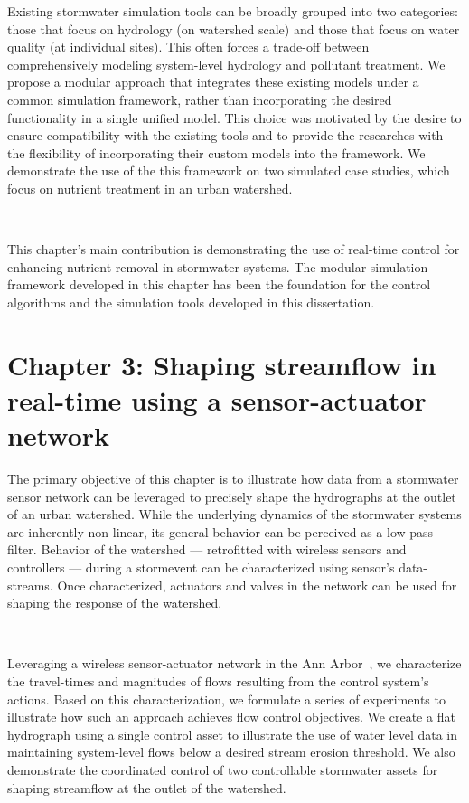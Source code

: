 Existing stormwater simulation tools can be broadly grouped into two categories: those that focus on hydrology (on watershed scale)\cite{Rossman2010Storm5.1} and those that focus on water quality (at individual sites)\cite{Langergraber2009CWM1:Wetlands}.
This often forces a trade-off between comprehensively modeling system-level hydrology and pollutant treatment.
We propose a modular approach that integrates these existing models under a common simulation framework, rather than incorporating the desired functionality in a single unified model.
This choice was motivated by the desire to ensure compatibility with the existing tools and to provide the researches with the flexibility of incorporating their custom models into the framework.
We demonstrate the use of the this framework on two simulated case studies, which focus on nutrient treatment in an urban watershed.

\

This chapter's main contribution is demonstrating the use of real-time control for enhancing nutrient removal in stormwater systems.
The modular simulation framework developed in this chapter has been the foundation for the control algorithms and the simulation tools developed in this dissertation. 

\section{Chapter 3: Shaping streamflow in real-time using a sensor-actuator network}

The primary objective of this chapter is to illustrate how data from a stormwater sensor network can be leveraged to precisely shape the hydrographs at the outlet of an urban watershed.
While the underlying dynamics of the stormwater systems are inherently non-linear, its general behavior can be perceived as a low-pass filter.
Behavior of the watershed --- retrofitted with wireless sensors and controllers --- during a stormevent can be characterized using sensor's data-streams.
Once characterized, actuators and valves in the network can be used for shaping the response of the watershed.

\

Leveraging a wireless sensor-actuator network in the Ann Arbor~\cite{Bartos_2018}, we characterize the travel-times and magnitudes of flows resulting from the control system's actions.
Based on this characterization, we formulate a series of experiments to illustrate how such an approach achieves flow control objectives.
We create a flat hydrograph using a single control asset to illustrate the use of water level data in maintaining system-level flows below a desired stream erosion threshold.
We also demonstrate the coordinated control of two controllable stormwater assets for shaping streamflow at the outlet of the watershed.

